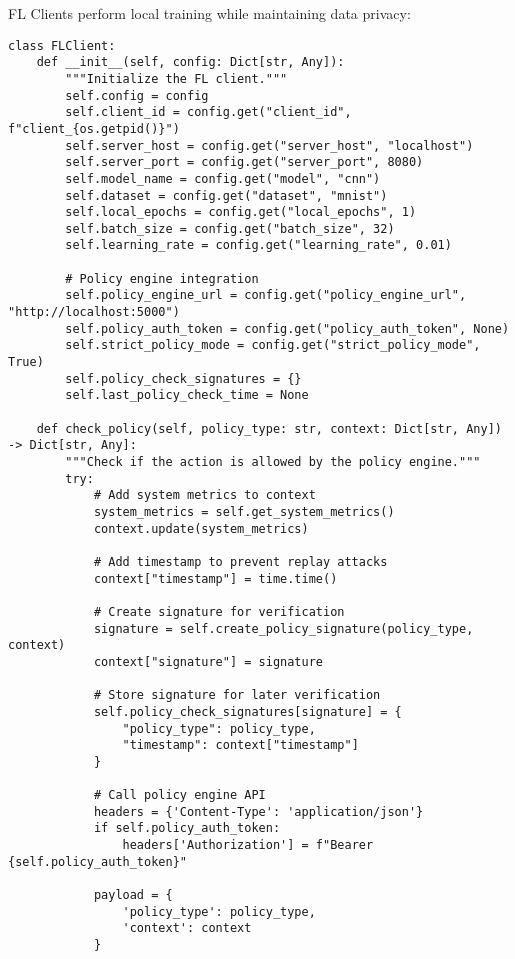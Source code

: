 FL Clients perform local training while maintaining data privacy:

\begin{lstlisting}[style=pythoncode, caption=FL Client Implementation]
class FLClient:
    def __init__(self, config: Dict[str, Any]):
        """Initialize the FL client."""
        self.config = config
        self.client_id = config.get("client_id", f"client_{os.getpid()}")
        self.server_host = config.get("server_host", "localhost")
        self.server_port = config.get("server_port", 8080)
        self.model_name = config.get("model", "cnn")
        self.dataset = config.get("dataset", "mnist")
        self.local_epochs = config.get("local_epochs", 1)
        self.batch_size = config.get("batch_size", 32)
        self.learning_rate = config.get("learning_rate", 0.01)
        
        # Policy engine integration
        self.policy_engine_url = config.get("policy_engine_url", "http://localhost:5000")
        self.policy_auth_token = config.get("policy_auth_token", None)
        self.strict_policy_mode = config.get("strict_policy_mode", True)
        self.policy_check_signatures = {}
        self.last_policy_check_time = None
        
    def check_policy(self, policy_type: str, context: Dict[str, Any]) -> Dict[str, Any]:
        """Check if the action is allowed by the policy engine."""
        try:
            # Add system metrics to context
            system_metrics = self.get_system_metrics()
            context.update(system_metrics)
            
            # Add timestamp to prevent replay attacks
            context["timestamp"] = time.time()
            
            # Create signature for verification
            signature = self.create_policy_signature(policy_type, context)
            context["signature"] = signature
            
            # Store signature for later verification
            self.policy_check_signatures[signature] = {
                "policy_type": policy_type,
                "timestamp": context["timestamp"]
            }
            
            # Call policy engine API
            headers = {'Content-Type': 'application/json'}
            if self.policy_auth_token:
                headers['Authorization'] = f"Bearer {self.policy_auth_token}"
                
            payload = {
                'policy_type': policy_type,
                'context': context
            }
            

\end{lstlisting}
